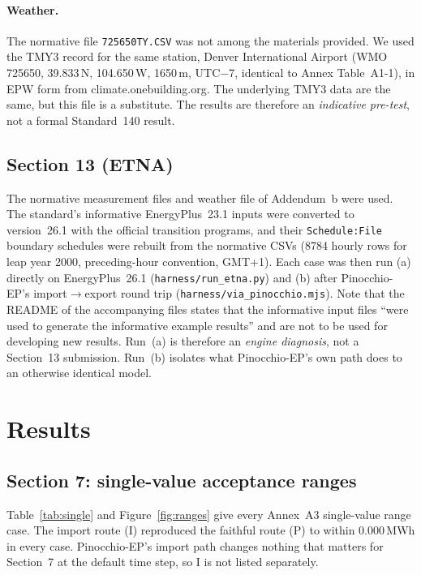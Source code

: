 \documentclass[10pt,a4paper]{article}
\newcommand{\code}[1]{\texttt{\small #1}}
\begin{document}
\paragraph{Weather.} The normative file \code{725650TY.CSV} was not among the materials provided. We used the TMY3
record for the same station, Denver International Airport (WMO 725650, 39.833\,N, 104.650\,W, 1650\,m, UTC$-$7,
identical to Annex Table~A1-1), in EPW form from climate.onebuilding.org. The underlying TMY3 data are the same,
but this file is a substitute. The results are therefore an \emph{indicative pre-test}, not a formal Standard~140
result.

\subsection{Section 13 (ETNA)}
The normative measurement files and weather file of Addendum~b were used. The standard's informative EnergyPlus~23.1
inputs were converted to version~26.1 with the official transition programs, and their \code{Schedule:File}
boundary schedules were rebuilt from the normative CSVs (8784 hourly rows for leap year 2000, preceding-hour
convention, GMT+1). Each case was then run (a) directly on EnergyPlus~26.1 (\code{harness/run\_etna.py}) and
(b) after Pinocchio-EP's import$\rightarrow$export round trip (\code{harness/via\_pinocchio.mjs}). Note that the
README of the accompanying files states that the informative input files ``were used to generate the informative
example results'' and are not to be used for developing new results. Run~(a) is therefore an \emph{engine
diagnosis}, not a Section~13 submission. Run~(b) isolates what Pinocchio-EP's own path does to an otherwise
identical model.

\section{Results}\label{sec:res}
\subsection{Section 7: single-value acceptance ranges}
Table~\ref{tab:single} and Figure~\ref{fig:ranges} give every Annex~A3 single-value range case. The import route
(I) reproduced the faithful route (P) to within 0.000\,MWh in every case. Pinocchio-EP's import path changes
nothing that matters for Section~7 at the default time step, so I is not listed separately.
\end{document}
